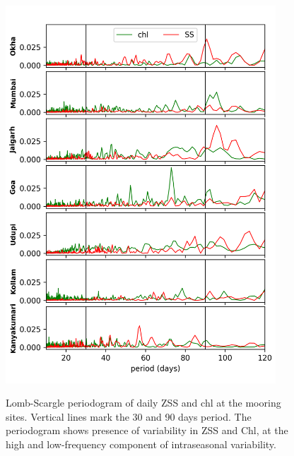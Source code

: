 \documentclass[authoryear,review,12pt]{elsarticle}
\newcounter{myfig} %
\begin{document}
\begin{figure}[htbp]
	\centering
	\includegraphics[width=0.9\textwidth]{./figures/Lombscargle_periodogram_daily_chl_ss.png} 
	\captionsetup{justification=justified,font=footnotesize,skip=0.05\baselineskip,width=\textwidth}
	\caption{Lomb-Scargle periodogram of daily ZSS and chl at the mooring sites. Vertical lines mark the 30 and 90 days period. The periodogram shows presence of variability in ZSS and Chl, at the high and low-frequency component of intraseasonal variability.}
	\label{fig:zss_chl_lombscarge}
	\label{myfig:e}
\end{figure}
\end{document}
